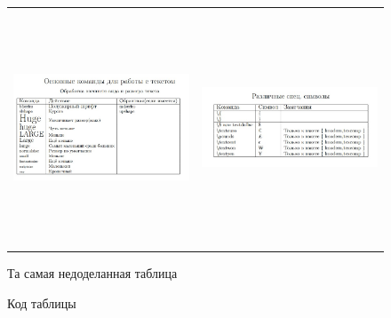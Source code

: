 \documentclass[a4paper,12pt]{report}
\begin{document}
\begin{figure}[h]
\begin{tabular}{cc}
\includegraphics[width=9cm,height=7cm]{table(1)}
&
\includegraphics[width=9cm,height=7cm]{table(2)}
\end{tabular}
\caption{Та самая недоделанная таблица}
\end{figure}
\newpage
\begin{figure}[h!]
\setlength{\fboxsep}{0pt}%
\setlength{\fboxrule}{1pt}%
%
\caption{Код таблицы}
\label{fig:image}
\end{figure}
\end{document}
